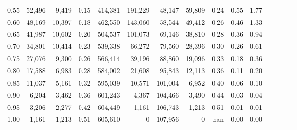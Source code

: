 \begin{tabular}{rrrcrrrrrrrrrrr}
0.55 &  52,496 &   9,419 &                                       0.15 &  414,381 &  191,229 &   48,147 &   59,809 &  0.24 &  0.55 &                         1.77 \\
0.60 &  48,169 &  10,397 &                                       0.18 &  462,550 &  143,060 &   58,544 &   49,412 &  0.26 &  0.46 &                         1.33 \\
0.65 &  41,987 &  10,602 &                                       0.20 &  504,537 &  101,073 &   69,146 &   38,810 &  0.28 &  0.36 &                         0.94 \\
0.70 &  34,801 &  10,414 &                                       0.23 &  539,338 &   66,272 &   79,560 &   28,396 &  0.30 &  0.26 &                         0.61 \\
0.75 &  27,076 &   9,300 &                                       0.26 &  566,414 &   39,196 &   88,860 &   19,096 &  0.33 &  0.18 &                         0.36 \\
0.80 &  17,588 &   6,983 &                                       0.28 &  584,002 &   21,608 &   95,843 &   12,113 &  0.36 &  0.11 &                         0.20 \\
0.85 &  11,037 &   5,161 &                                       0.32 &  595,039 &   10,571 &  101,004 &    6,952 &  0.40 &  0.06 &                         0.10 \\
0.90 &   6,204 &   3,462 &                                       0.36 &  601,243 &    4,367 &  104,466 &    3,490 &  0.44 &  0.03 &                         0.04 \\
0.95 &   3,206 &   2,277 &                                       0.42 &  604,449 &    1,161 &  106,743 &    1,213 &  0.51 &  0.01 &                         0.01 \\
1.00 &   1,161 &   1,213 &                                       0.51 &  605,610 &        0 &  107,956 &        0 &   nan &  0.00 &                         0.00 \\
\bottomrule
\end{tabular}

